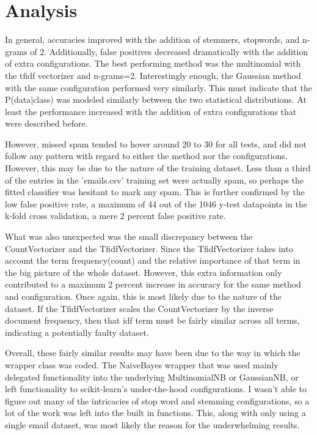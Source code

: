 \documentclass{article}
\begin{document}
\section{Analysis}
\begin{paragraph}
In general, accuracies improved with the addition of stemmers, stopwords, and n-grams of 2. Additionally, false positives decreased dramatically with the addition of extra configurations. The best performing method was the multinomial with the tfidf vectorizer and n-grams=2. Interestingly enough, the Gaussian method with the same configuration performed very similarly. This must indicate that the P(data|class) was modeled similarly between the two statistical distributions. At least the performance increased with the addition of extra configurations that were described before.
\end{paragraph}
\begin{paragraph}
However, missed spam tended to hover around 20 to 30 for all tests, and did not follow any pattern with regard to either the method nor the configurations. However, this may be due to the nature of the training dataset. Less than a third of the entries in the 'emails.csv' training set were actually spam, so perhaps the fitted classifier was hesitant to mark any spam. This is further confirmed by the low false positive rate, a maximum of 44 out of the 1046 y-test datapoints in the k-fold cross validation, a mere 2 percent false positive rate.
\end{paragraph}
\begin{paragraph}
What was also unexpected was the small discrepancy between the CountVectorizer and the TfidfVectorizer. Since the TfidfVectorizer takes into account the term frequency(count) and the relative importance of that term in the big picture of the whole dataset. However, this extra information only contributed to a maximum 2 percent increase in accuracy for the same method and configuration. Once again, this is most likely due to the nature of the dataset. If the TfidfVectorizer scales the CountVectorizer by the inverse document frequency, then that idf term must be fairly similar across all terms, indicating a potentially faulty dataset.
\end{paragraph}
\begin{paragraph}
Overall, these fairly similar results may have been due to the way in which the wrapper class was coded. The NaiveBayes wrapper that was used mainly delegated functionality into the underlying MultinomialNB or GaussianNB, or left functionality to scikit-learn's under-the-hood configurations. I wasn't able to figure out many of the intricacies of stop word and stemming configurations, so a lot of the work was left into the built in functions. This, along with only using a single email dataset, was most likely the reason for the underwhelming results.
\end{paragraph}
\end{document}
